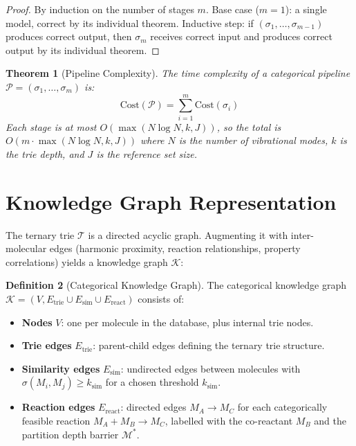 \documentclass[11pt,twocolumn,a4paper]{article}
\newtheorem{theorem}{Theorem}[section]
\theoremstyle{definition}
\newtheorem{definition}[theorem]{Definition}
\theoremstyle{remark}
\newcommand{\Depth}{\mathcal{M}}
\newcommand{\Trie}{\mathcal{T}}
\newcommand{\Pipeline}{\mathcal{P}}
\newcommand{\KGraph}{\mathcal{K}}
\begin{document}
\begin{proof}
By induction on the number of stages $m$. Base case ($m = 1$): a single model, correct by its individual theorem. Inductive step: if $(\sigma_1, \ldots, \sigma_{m-1})$ produces correct output, then $\sigma_m$ receives correct input and produces correct output by its individual theorem.
\end{proof}

\begin{theorem}[Pipeline Complexity]
\label{thm:pipeline_complexity}
The time complexity of a categorical pipeline $\Pipeline = (\sigma_1, \ldots, \sigma_m)$ is:
\begin{equation}
\text{Cost}(\Pipeline) = \sum_{i=1}^{m} \text{Cost}(\sigma_i)
\label{eq:pipeline_cost}
\end{equation}
Each stage is at most $O(\max(N \log N, k, J))$, so the total is $O(m \cdot \max(N \log N, k, J))$ where $N$ is the number of vibrational modes, $k$ is the trie depth, and $J$ is the reference set size.
\end{theorem}


\section{Knowledge Graph Representation}
\label{sec:knowledge_graph}

The ternary trie $\Trie$ is a directed acyclic graph. Augmenting it with inter-molecular edges (harmonic proximity, reaction relationships, property correlations) yields a knowledge graph $\KGraph$:

\begin{definition}[Categorical Knowledge Graph]
\label{def:knowledge_graph}
The categorical knowledge graph $\KGraph = (V, E_{\mathrm{trie}} \cup E_{\mathrm{sim}} \cup E_{\mathrm{react}})$ consists of:
\begin{itemize}[nosep]
\item \textbf{Nodes} $V$: one per molecule in the database, plus internal trie nodes.
\item \textbf{Trie edges} $E_{\mathrm{trie}}$: parent-child edges defining the ternary trie structure.
\item \textbf{Similarity edges} $E_{\mathrm{sim}}$: undirected edges between molecules with $\sigma(M_i, M_j) \geq k_{\mathrm{sim}}$ for a chosen threshold $k_{\mathrm{sim}}$.
\item \textbf{Reaction edges} $E_{\mathrm{react}}$: directed edges $M_A \to M_C$ for each categorically feasible reaction $M_A + M_B \to M_C$, labelled with the co-reactant $M_B$ and the partition depth barrier $\Depth^*$.
\end{itemize}
\end{definition}
\end{document}
